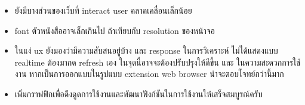 \documentclass[12pt,oneside,openright,a4paper]{cpe-thai-project}
\begin{document}
\begin{enumerate}
\begin{itemize}
          \item ยังมีบางส่วนของเว็บที่ interact user คลาดเคลื่อนเล็กน้อย
          \item font ตัวหนังสืออาจเล็กเกินไป ถ้าเทียบกับ resolution ของหน้าจอ
          \item ในแง่ ux ยังมองว่ามีความสับสนอยู่บ้าง และ response ในการวิเคราะห์ ไม่ได้แสดงแบบ realtime ต้องมากด refresh เอง ในจุดนี้อาจจะต้องปรับปรุงให้ดีขึ้น และ ในความสะดวกการใช้งาน หากเป็นการออกแบบในรูปแบบ extension web browser น่าจะตอบโจทย์กว่านี้มาก
          \item เพิ่มกราฟฟิกเพื่อดึงดูดการใช้งานและพัฒนาฟังก์ชันในการใช้งานให้เสร็จสมบูรณ์ครับ
        \end{itemize}
\end{enumerate}

\end{document}
